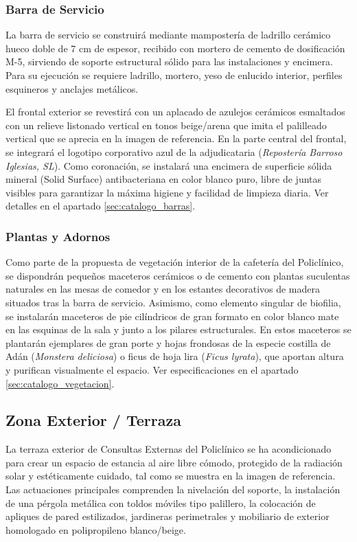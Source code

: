 \documentclass[12pt,a4paper]{article}
\begin{document}
\subsubsection{Barra de Servicio}
La barra de servicio se construirá mediante mampostería de ladrillo cerámico hueco doble de 7 cm de espesor, recibido con mortero de cemento de dosificación M-5, sirviendo de soporte estructural sólido para las instalaciones y encimera. Para su ejecución se requiere ladrillo, mortero, yeso de enlucido interior, perfiles esquineros y anclajes metálicos. 

El frontal exterior se revestirá con un aplacado de azulejos cerámicos esmaltados con un relieve listonado vertical en tonos beige/arena que imita el palilleado vertical que se aprecia en la imagen de referencia. En la parte central del frontal, se integrará el logotipo corporativo azul de la adjudicataria (\textit{Repostería Barroso Iglesias, SL}). Como coronación, se instalará una encimera de superficie sólida mineral (Solid Surface) antibacteriana en color blanco puro, libre de juntas visibles para garantizar la máxima higiene y facilidad de limpieza diaria. Ver detalles en el apartado \ref{sec:catalogo_barras}.

\subsubsection{Plantas y Adornos}
Como parte de la propuesta de vegetación interior de la cafetería del Policlínico, se dispondrán pequeños maceteros cerámicos o de cemento con plantas suculentas naturales en las mesas de comedor y en los estantes decorativos de madera situados tras la barra de servicio. Asimismo, como elemento singular de biofilia, se instalarán maceteros de pie cilíndricos de gran formato en color blanco mate en las esquinas de la sala y junto a los pilares estructurales. En estos maceteros se plantarán ejemplares de gran porte y hojas frondosas de la especie costilla de Adán (\textit{Monstera deliciosa}) o ficus de hoja lira (\textit{Ficus lyrata}), que aportan altura y purifican visualmente el espacio. Ver especificaciones en el apartado \ref{sec:catalogo_vegetacion}.

\subsection{Zona Exterior / Terraza}
La terraza exterior de Consultas Externas del Policlínico se ha acondicionado para crear un espacio de estancia al aire libre cómodo, protegido de la radiación solar y estéticamente cuidado, tal como se muestra en la imagen de referencia. Las actuaciones principales comprenden la nivelación del soporte, la instalación de una pérgola metálica con toldos móviles tipo palillero, la colocación de apliques de pared estilizados, jardineras perimetrales y mobiliario de exterior homologado en polipropileno blanco/beige.
\end{document}
